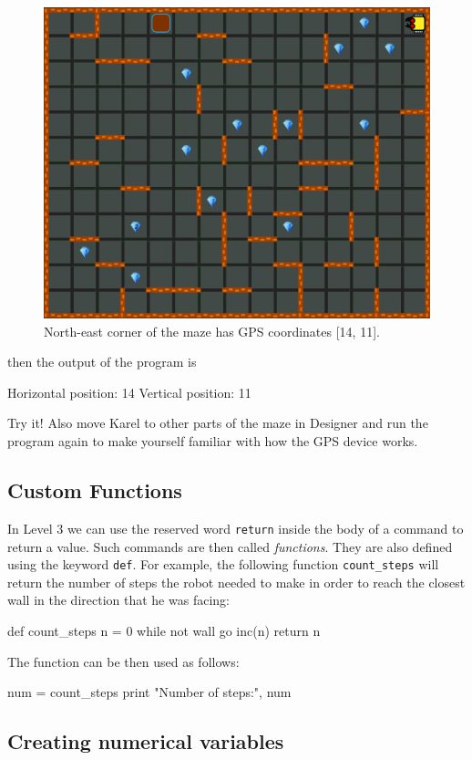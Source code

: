 \begin{figure}[!ht]
\begin{center}
\includegraphics[height=0.4\textwidth]{imgk/gps-101.png}
\vspace{-0mm}
\caption{North-east corner of the maze has GPS coordinates [14, 11].}
\label{fig:gps-101}
\end{center}
\end{figure}
\newpage
\noindent
then the output of the program is

\begin{bluecode}
Horizontal position: 14
Vertical position: 11
\end{bluecode}
Try it! Also move Karel to other parts of the maze in Designer and run the program again
to make yourself familiar with how the GPS device works.

\subsection{Custom Functions}

In Level 3 we can use the reserved word {\tt return} inside the body of
a command to return a value. Such commands are then called {\em functions}. 
They are also defined using the keyword {\tt def}. For example, the following function
{\tt count\_steps} will return the number of steps the robot needed to 
make in order to reach the closest wall in the direction that he was facing:

\begin{bluecode}
def count_steps
    n = 0
    while not wall
        go
        inc(n)
    return n
\end{bluecode}
The function can be then used as follows:

\begin{bluecode}
num = count_steps
print "Number of steps:", num 
\end{bluecode}

\subsection{Creating numerical variables} \label{par:var}

